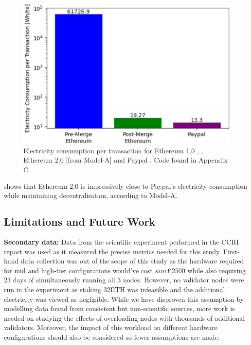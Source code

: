 \begin{figure}[!htb]
    \includegraphics[width=13cm,center]{Figures/PaypalEthElectrcityPlot.png}
    \caption{Electricity consumption per transaction for Ethereum 1.0 \cite{CCRIIndices}, \cite{EthereumBlockchair}, Ethereum 2.0 [from Model-A] and Paypal \cite{2007IntroductionPayPal}. Code found in Appendix C.}
    \label{Figure:PaypalEthElectrcityPlot}
\end{figure}

 shows that Ethereum 2.0 is impressively close to Paypal's electricity consumption while maintaining decentralisation, according to Model-A.



\subsection{Limitations and Future Work}
\label{LimitationsFutureWork}

\textbf{Secondary data:} Data from the scientific experiment performed in the CCRI report \cite{CryptoCarbonRatingsInstitute2022TheNetwork} was used as it measured the precise metrics needed for this study. First-hand data collection was out of the scope of this study as the hardware required for mid and high-tier configurations would've cost $sim$£2500 while also requiring 23 days of simultaneously running all 3 nodes. However, no validator nodes were run in the experiment as staking 32ETH was infeasible and the additional electricity was viewed as negligible. While we have disproven this assumption by modelling data found from consistent but non-scientific sources, more work is needed on studying the effects of overloading nodes with thousands of additional validators. Moreover, the impact of this workload on different hardware configurations should also be considered so fewer assumptions are made. 

